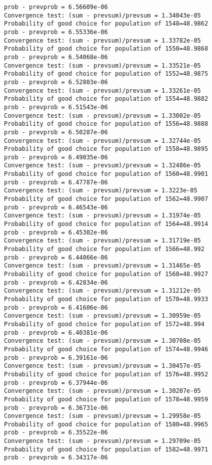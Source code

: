 \documentclass[11pt,onecolumn]{article}
\begin{document}
\begin{verbatim}
prob - prevprob = 6.56609e-06
Convergence test: (sum - prevsum)/prevsum = 1.34043e-05
Probability of good choice for population of 1548=48.9862
prob - prevprob = 6.55336e-06
Convergence test: (sum - prevsum)/prevsum = 1.33782e-05
Probability of good choice for population of 1550=48.9868
prob - prevprob = 6.54068e-06
Convergence test: (sum - prevsum)/prevsum = 1.33521e-05
Probability of good choice for population of 1552=48.9875
prob - prevprob = 6.52803e-06
Convergence test: (sum - prevsum)/prevsum = 1.33261e-05
Probability of good choice for population of 1554=48.9882
prob - prevprob = 6.51543e-06
Convergence test: (sum - prevsum)/prevsum = 1.33002e-05
Probability of good choice for population of 1556=48.9888
prob - prevprob = 6.50287e-06
Convergence test: (sum - prevsum)/prevsum = 1.32744e-05
Probability of good choice for population of 1558=48.9895
prob - prevprob = 6.49035e-06
Convergence test: (sum - prevsum)/prevsum = 1.32486e-05
Probability of good choice for population of 1560=48.9901
prob - prevprob = 6.47787e-06
Convergence test: (sum - prevsum)/prevsum = 1.3223e-05
Probability of good choice for population of 1562=48.9907
prob - prevprob = 6.46543e-06
Convergence test: (sum - prevsum)/prevsum = 1.31974e-05
Probability of good choice for population of 1564=48.9914
prob - prevprob = 6.45302e-06
Convergence test: (sum - prevsum)/prevsum = 1.31719e-05
Probability of good choice for population of 1566=48.992
prob - prevprob = 6.44066e-06
Convergence test: (sum - prevsum)/prevsum = 1.31465e-05
Probability of good choice for population of 1568=48.9927
prob - prevprob = 6.42834e-06
Convergence test: (sum - prevsum)/prevsum = 1.31212e-05
Probability of good choice for population of 1570=48.9933
prob - prevprob = 6.41606e-06
Convergence test: (sum - prevsum)/prevsum = 1.30959e-05
Probability of good choice for population of 1572=48.994
prob - prevprob = 6.40381e-06
Convergence test: (sum - prevsum)/prevsum = 1.30708e-05
Probability of good choice for population of 1574=48.9946
prob - prevprob = 6.39161e-06
Convergence test: (sum - prevsum)/prevsum = 1.30457e-05
Probability of good choice for population of 1576=48.9952
prob - prevprob = 6.37944e-06
Convergence test: (sum - prevsum)/prevsum = 1.30207e-05
Probability of good choice for population of 1578=48.9959
prob - prevprob = 6.36731e-06
Convergence test: (sum - prevsum)/prevsum = 1.29958e-05
Probability of good choice for population of 1580=48.9965
prob - prevprob = 6.35522e-06
Convergence test: (sum - prevsum)/prevsum = 1.29709e-05
Probability of good choice for population of 1582=48.9971
prob - prevprob = 6.34317e-06

\end{verbatim}
\end{document}
